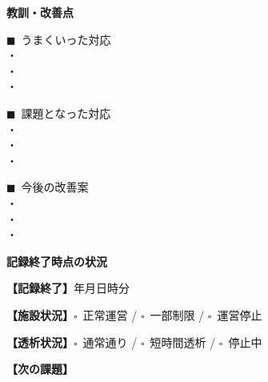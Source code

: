 \documentclass[a4paper,12pt]{jarticle}
\newcommand{\checkbox}{$\square$\ }
\newcommand{\checkedbox}{$\blacksquare$\ }
\newcommand{\underlinespace}[1]{\underline{\hspace{#1}}}
\begin{document}
\begin{center}
\textbf{\large 教訓・改善点}
\end{center}

\vspace{3mm}

\noindent
\checkedbox うまくいった対応 \\
・\underlinespace{12cm} \\
・\underlinespace{12cm} \\
・\underlinespace{12cm}

\vspace{3mm}

\noindent
\checkedbox 課題となった対応 \\
・\underlinespace{12cm} \\
・\underlinespace{12cm} \\
・\underlinespace{12cm}

\vspace{3mm}

\noindent
\checkedbox 今後の改善案 \\
・\underlinespace{12cm} \\
・\underlinespace{12cm} \\
・\underlinespace{12cm}

\vspace{5mm}

\begin{center}
\textbf{\large 記録終了時点の状況}
\end{center}

\vspace{3mm}

\noindent
\textbf{【記録終了】}\underlinespace{1.5cm}年\underlinespace{1cm}月\underlinespace{1cm}日\underlinespace{1cm}時\underlinespace{1cm}分

\vspace{2mm}

\noindent
\textbf{【施設状況】}\checkbox 正常運営 / \checkbox 一部制限 / \checkbox 運営停止

\vspace{2mm}

\noindent
\textbf{【透析状況】}\checkbox 通常通り / \checkbox 短時間透析 / \checkbox 停止中

\vspace{2mm}

\noindent
\textbf{【次の課題】}\underlinespace{10cm}
\end{document}
